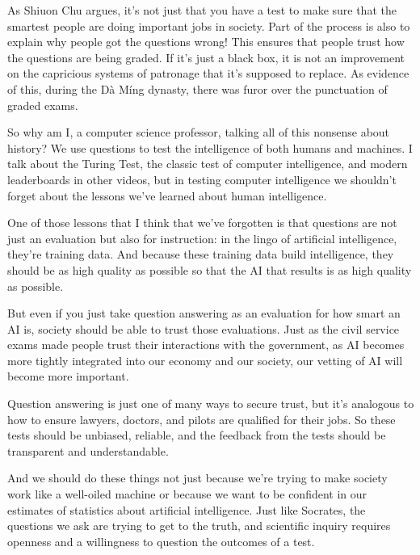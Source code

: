 As  Shiuon Chu argues, it’s not just that you have a test to make sure that the smartest people are doing important jobs in society.  Part of the process is also to explain why people got the questions wrong!  This ensures that people trust how the questions are being graded.  If it’s just a black box, it is not an improvement on the capricious systems of patronage that it’s supposed to replace.  As evidence of this, during the Dà Míng dynasty, there was furor over the punctuation of graded exams.

So why am I, a computer science professor, talking all of this nonsense about history?  We use questions to test the intelligence of both humans and machines.  I talk about the Turing Test, the classic test of computer intelligence, and modern leaderboards in other videos, but in testing computer intelligence we shouldn’t forget about the lessons we’ve learned about human intelligence.

One of those lessons that I think that we’ve forgotten is that questions are not just an evaluation but also for instruction: in the lingo of artificial intelligence, they’re training data.  And because these training data build intelligence, they should be as high quality as possible so that the AI that results is as high quality as possible.

But even if you just take question answering as an evaluation for how smart an AI is, society should be able to trust those evaluations.  Just as the civil service exams made people trust their interactions with the government, as AI becomes more tightly integrated into our economy and our society, our vetting of AI will become more important.

Question answering is just one of many ways to secure trust, but it’s analogous to how to ensure lawyers, doctors, and pilots are qualified for their jobs.  So these tests should be unbiased, reliable, and the feedback from the tests should be transparent and understandable.

And we should do these things not just because we’re trying to make society work like a well-oiled machine or because we want to be confident in our estimates of statistics about artificial intelligence.  Just like Socrates, the questions we ask are trying to get to the truth, and scientific inquiry requires openness and a willingness to question the outcomes of a test.
